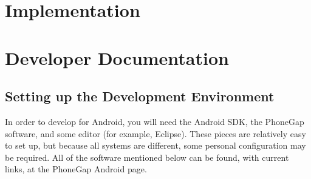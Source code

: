 \documentclass[12pt]{article}
\begin{document}
\section{Implementation}
\label{sec:implementation}

\section{Developer Documentation}

\label{sec:developerdocumentation}

\subsection{Setting up the Development Environment}
In order to develop for Android, you will need the Android SDK, the PhoneGap software, and some editor (for example, Eclipse).  These pieces are relatively easy to set up, but because all systems are different, some personal configuration may be required.  All of the software mentioned below can be found, with current links, at the PhoneGap Android page\cite{PhoneGap-Android}.  
\end{document}
